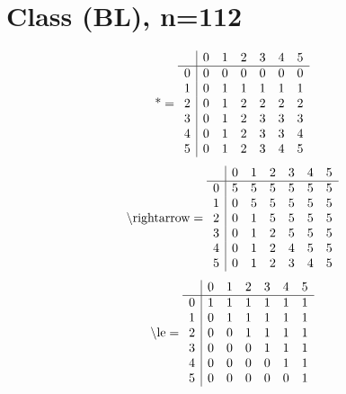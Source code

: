 \documentclass[11pt]{article}
\begin{document}
\section{Class (BL), n=112}
\[\text{*} = 
\begin{array}{r | r r r r r r}
 & 0 & 1 & 2 & 3 & 4 & 5 \\ \hline
0 & 0 & 0 & 0 & 0 & 0 & 0 \\
1 & 0 & 1 & 1 & 1 & 1 & 1 \\
2 & 0 & 1 & 2 & 2 & 2 & 2 \\
3 & 0 & 1 & 2 & 3 & 3 & 3 \\
4 & 0 & 1 & 2 & 3 & 3 & 4 \\
5 & 0 & 1 & 2 & 3 & 4 & 5 \\
\end{array}
\]
\[\text{\textbackslash rightarrow} = 
\begin{array}{r | r r r r r r}
 & 0 & 1 & 2 & 3 & 4 & 5 \\ \hline
0 & 5 & 5 & 5 & 5 & 5 & 5 \\
1 & 0 & 5 & 5 & 5 & 5 & 5 \\
2 & 0 & 1 & 5 & 5 & 5 & 5 \\
3 & 0 & 1 & 2 & 5 & 5 & 5 \\
4 & 0 & 1 & 2 & 4 & 5 & 5 \\
5 & 0 & 1 & 2 & 3 & 4 & 5 \\
\end{array}
\]
\[\text{\textbackslash le} = 
\begin{array}{r | r r r r r r}
 & 0 & 1 & 2 & 3 & 4 & 5 \\ \hline
0 & 1 & 1 & 1 & 1 & 1 & 1 \\
1 & 0 & 1 & 1 & 1 & 1 & 1 \\
2 & 0 & 0 & 1 & 1 & 1 & 1 \\
3 & 0 & 0 & 0 & 1 & 1 & 1 \\
4 & 0 & 0 & 0 & 0 & 1 & 1 \\
5 & 0 & 0 & 0 & 0 & 0 & 1 \\
\end{array}
\]
\end{document}
